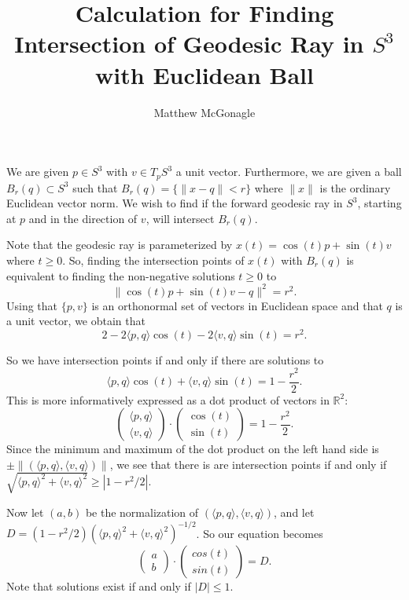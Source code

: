 \documentclass{article}
\title{Calculation for Finding Intersection of Geodesic Ray in \(S^3\) with Euclidean Ball}
\author{Matthew McGonagle}
\begin{document}
\maketitle

    We are given \(p\in S^3\) with \(v \in T_p S^3\) a unit vector. Furthermore, we are given a ball \(B_r(q)\subset S^3\) such that \(B_r(q) = \{\|x - q\|<r\}\) where \(\|x\|\) is the ordinary Euclidean vector norm. We wish to find if the forward geodesic ray in \(S^3\), starting at \(p\) and in the direction of \(v\), will intersect \(B_r(q)\). 

    Note that the geodesic ray is parameterized by \(x(t) = \cos(t) p + \sin(t) v\) where \(t\geq 0\). So, finding the intersection points of \(x(t)\) with \(B_r(q)\) is equivalent to finding the non-negative solutions \(t\geq 0\) to 
\[\|\cos(t) p +\sin(t) v - q\|^2 = r^2.\]
Using that \(\{p,v\}\) is an orthonormal set of vectors in Euclidean space and that \(q\) is a unit vector, we obtain that
\[ 2 - 2\langle p,q \rangle \cos(t) - 2 \langle v, q\rangle \sin(t) = r^2.\]

So we have intersection points if and only if there are solutions to 
\[\langle p,q \rangle \cos(t) + \langle v, q\rangle \sin(t) = 1 - \frac{r^2}{2}. \]
This is more informatively expressed as a dot product of vectors in \(\mathbb R^2\):
\[\begin{pmatrix} \langle p,q\rangle \\ \langle v, q \rangle\end{pmatrix} \cdot \begin{pmatrix} \cos(t) \\ \sin(t) \end{pmatrix} = 1 - \frac{r^2}{2}. \]
Since the minimum and maximum of the dot product on the left hand side is \(\pm \|(\langle p,q\rangle, \langle v, q\rangle)\|\), we see that there is are intersection points if and only if \(\sqrt{\langle p,q\rangle^2 + \langle v,q\rangle^2} \geq |1 - r^2/2|.\)

Now let \((a,b)\) be the normalization of \((\langle p,q\rangle, \langle v, q\rangle)\), and let \(D = (1-r^2/2)(\langle p,q\rangle^2 + \langle v, q\rangle^2)^{-1/2}\). So our equation becomes
\[\begin{pmatrix} a \\ b \end{pmatrix} \cdot \begin{pmatrix} cos(t) \\ sin(t) \end{pmatrix} = D.\] 
Note that solutions exist if and only if \( |D|\leq 1\).
\end{document}
